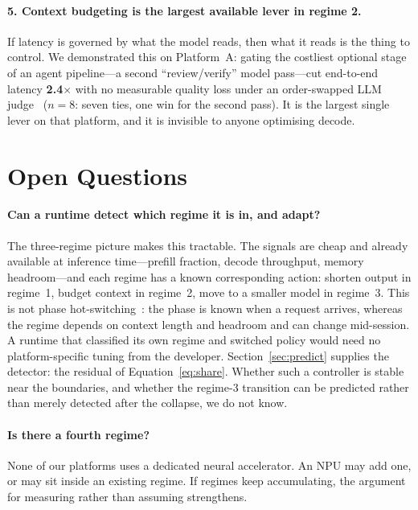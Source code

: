 \documentclass[sigconf,nonacm,10pt]{acmart}
\begin{document}
\paragraph{5. Context budgeting is the largest available lever in regime 2.}
If latency is governed by what the model reads, then what it reads is the thing to control. We demonstrated
this on Platform~A: gating the costliest optional stage of an agent pipeline---a second ``review/verify'' model
pass---cut end-to-end latency \textbf{2.4$\times$} with no measurable quality loss under an order-swapped LLM
judge~\cite{zheng2023judging} ($n=8$: seven ties, one win for the second pass). It is the largest single lever on that platform, and it is invisible to anyone
optimising decode.

\section{Open Questions}
\label{sec:open}

\paragraph{Can a runtime detect which regime it is in, and adapt?} The three-regime picture makes this
tractable. The signals are cheap and
already available at inference time---prefill fraction, decode throughput, memory headroom---and each regime has
a known corresponding action: shorten output in regime~1, budget context in regime~2, move to
a smaller model in regime~3. This is not phase hot-switching~\cite{zhao2025sandwich}: the phase is known when
a request arrives, whereas the regime depends on context length and headroom and can change mid-session. A runtime that classified its own regime and switched policy would need no
platform-specific tuning from the developer. Section~\ref{sec:predict} supplies the detector: the residual of
Equation~\ref{eq:share}. Whether such a controller is stable near the boundaries, and whether the regime-3
transition can be predicted rather than merely detected after the collapse, we do not know.

\paragraph{Is there a fourth regime?} None of our platforms uses a dedicated neural accelerator. An NPU may add
one, or may sit inside an existing regime. If regimes keep accumulating, the argument for measuring rather than
assuming strengthens.
\end{document}
